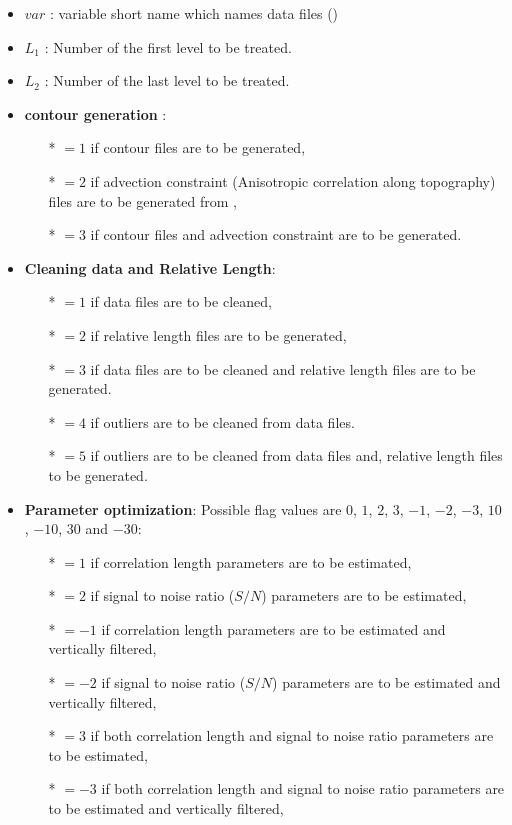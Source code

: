\begin{itemize}
\item $var$ :  variable short name which names data files ()
\item $L_1$ :  Number of the first level to be treated. 
\item $L_2$ :  Number of the last level to be treated.
\item {\bf contour generation} : 
              \begin{itemize}
                \item[*] $=1$ if contour files are to be generated,
                \item[*] $=2$ if advection constraint (Anisotropic correlation along topography) files are to be generated from  ,
                \item[*] $=3$ if contour files and advection constraint are to be generated.
              \end{itemize}
\item {\bf Cleaning data and Relative Length}: 
              \begin{itemize}
                \item[*] $=1$ if data files are to be cleaned,
                \item[*] $=2$ if relative length files are to be generated,
                \item[*] $=3$ if data files are to be cleaned and relative length files are to be generated.
                \item[*] $=4$ if outliers are to be cleaned from data files.
                \item[*] $=5$ if outliers are to be cleaned from data files and, relative length files to be generated.
              \end{itemize}


\item {\bf Parameter optimization}: Possible flag values are $0$, $1$, $2$, $3$, $-1$, $-2$, $-3$, $10$, $-10$, $30$ and $-30$:
              \begin{itemize}
                \item[*] $=1$ if correlation length parameters are to be estimated,
                \item[*] $=2$ if signal to noise ratio ($S/N$) parameters are to be estimated,
                \item[*] $=-1$ if correlation length parameters are to be estimated and vertically filtered,
                \item[*] $=-2$ if signal to noise ratio ($S/N$) parameters are to be estimated and vertically filtered,
                \item[*] $=3$ if both  correlation length and  signal to noise ratio parameters are to be estimated,
                \item[*] $=-3$ if both  correlation length and  signal to noise ratio parameters are to be estimated and vertically filtered,


\end{itemize}
\end{itemize}
